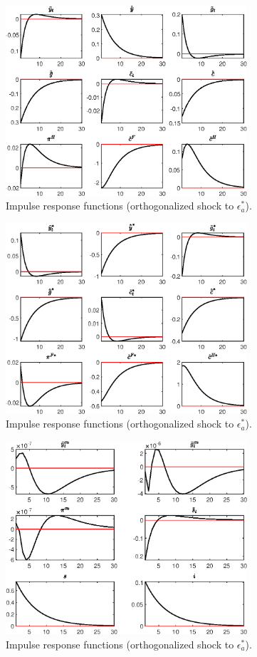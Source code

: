  
\begin{figure}[H]
\centering 
\includegraphics[width=0.80\textwidth]{MODEL_MAIN_2/graphs/MODEL_MAIN_2_IRF_eps_a_starr1}
\caption{Impulse response functions (orthogonalized shock to ${\epsilon_a^*}$).}\label{Fig:IRF:eps_a_starr:1}
\end{figure}
 
\begin{figure}[H]
\centering 
\includegraphics[width=0.80\textwidth]{MODEL_MAIN_2/graphs/MODEL_MAIN_2_IRF_eps_a_starr2}
\caption{Impulse response functions (orthogonalized shock to ${\epsilon_a^*}$).}\label{Fig:IRF:eps_a_starr:2}
\end{figure}
 
\begin{figure}[H]
\centering 
\includegraphics[width=0.80\textwidth]{MODEL_MAIN_2/graphs/MODEL_MAIN_2_IRF_eps_a_starr3}
\caption{Impulse response functions (orthogonalized shock to ${\epsilon_a^*}$).}\label{Fig:IRF:eps_a_starr:3}
\end{figure}
 
 

